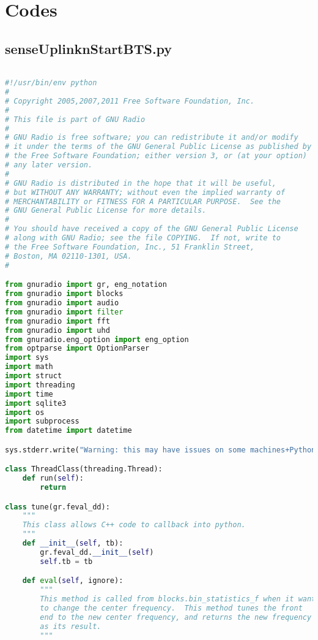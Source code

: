 \chapter{Codes}

\section{senseUplinknStartBTS.py}

\begin{lstlisting}[language=Python]

#!/usr/bin/env python
#
# Copyright 2005,2007,2011 Free Software Foundation, Inc.
#
# This file is part of GNU Radio
#
# GNU Radio is free software; you can redistribute it and/or modify
# it under the terms of the GNU General Public License as published by
# the Free Software Foundation; either version 3, or (at your option)
# any later version.
#
# GNU Radio is distributed in the hope that it will be useful,
# but WITHOUT ANY WARRANTY; without even the implied warranty of
# MERCHANTABILITY or FITNESS FOR A PARTICULAR PURPOSE.  See the
# GNU General Public License for more details.
#
# You should have received a copy of the GNU General Public License
# along with GNU Radio; see the file COPYING.  If not, write to
# the Free Software Foundation, Inc., 51 Franklin Street,
# Boston, MA 02110-1301, USA.
#

from gnuradio import gr, eng_notation
from gnuradio import blocks
from gnuradio import audio
from gnuradio import filter
from gnuradio import fft
from gnuradio import uhd
from gnuradio.eng_option import eng_option
from optparse import OptionParser
import sys
import math
import struct
import threading
import time
import sqlite3
import os
import subprocess
from datetime import datetime

sys.stderr.write("Warning: this may have issues on some machines+Python version combinations to seg fault due to the callback in bin_statitics.\n\n")

class ThreadClass(threading.Thread):
    def run(self):
        return

class tune(gr.feval_dd):
    """
    This class allows C++ code to callback into python.
    """
    def __init__(self, tb):
        gr.feval_dd.__init__(self)
        self.tb = tb

    def eval(self, ignore):
        """
        This method is called from blocks.bin_statistics_f when it wants
        to change the center frequency.  This method tunes the front
        end to the new center frequency, and returns the new frequency
        as its result.
        """


\end{lstlisting}
